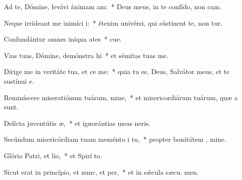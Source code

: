 \item Ad te, Dómine, levávi ánimam am:~* Deus meus, in te confído, non cam.
\item Neque irrídeant me inimíci i:~* étenim univérsi, qui sústinent te, non tur.
\item Confundántur omnes iníqua ates~* cue.
\item Vias tuas, Dómine, demónstra hi~* et sémitas tuas  me.
\item Dírige me in veritáte tua, et ce me:~* quia tu es, Deus, Salvátor meus, et te sustínui  e.
\item Reminíscere miseratiónum tuárum, mine,~* et misericordiárum tuárum, quæ a  sunt.
\item Delícta juventútis æ,~* et ignorántias meas  neris.
\item Secúndum misericórdiam tuam meménto i tu,~* propter bonitátem , mine.
\item Glória Patri, et lio,~* et Spirí to.
\item Sicut erat in princípio, et nunc, et per,~* et in sǽcula sæcu. men.
